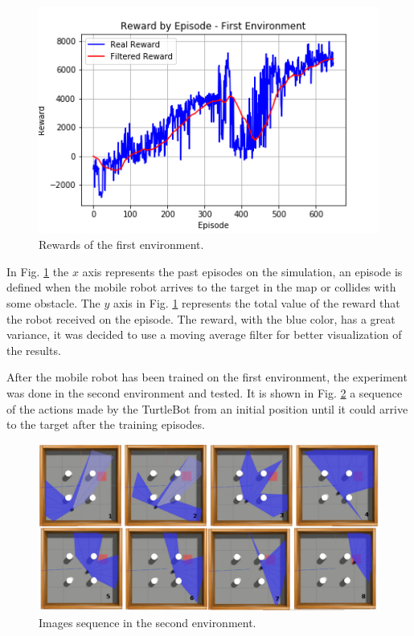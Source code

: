 \begin{figure}[htbp]
\centerline{\includegraphics[width=\columnwidth]{images/stage_1.png}}
\caption{Rewards of the first environment.}
\label{fig:stage_1}
\end{figure}

In Fig. \ref{fig:stage_1} the $x$ axis represents the past episodes on the simulation, an episode is defined when the mobile robot arrives to the target in the map or collides with some obstacle. 
The $y$ axis in Fig. \ref{fig:stage_1} represents the total value of the reward that the robot received on the episode.
The reward, with the blue color, has a great variance, it was decided to use a moving average filter for better visualization of the results.

After the mobile robot has been trained on the first environment, the experiment was done in the second environment and tested. It is shown in Fig. \ref{fig:amb2target} a sequence of the actions made by the TurtleBot from an initial position until it could arrive to the target after the training episodes.

\begin{figure}[htbp]
\centerline{\includegraphics[width=\columnwidth]{images/amb2target.png}}
\caption{Images sequence in the second environment.}
\label{fig:amb2target}
\end{figure}

